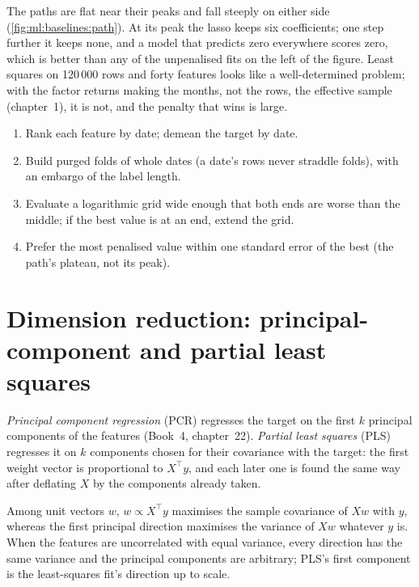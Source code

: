 The paths are flat near their peaks and fall steeply on either side (\cref{fig:ml:baselines:path}). At its peak the
lasso keeps six coefficients; one step further it keeps none, and a model that predicts zero everywhere scores
zero, which is better than any of the unpenalised fits on the left of the figure. Least squares on 120\,000
rows and forty features looks like a well-determined problem; with the factor returns making the months, not the rows,
the effective sample (chapter~1), it is not, and the penalty that wins is large.

\begin{method}\label{met:ml:baselines:penalty}
\begin{enumerate}
\item Rank each feature by date; demean the target by date.
\item Build purged folds of whole dates (a date's rows never straddle folds), with an embargo of the label length.
\item Evaluate a logarithmic grid wide enough that both ends are worse than the middle; if the best value is at an end,
extend the grid.
\item Prefer the most penalised value within one standard error of the best (the path's plateau, not its peak).
\end{enumerate}
\end{method}

\section{Dimension reduction: principal-component and partial least squares}

\begin{definition}\label{def:ml:linear-and-regularised-baselines:pcr}
\emph{Principal component regression} (PCR) regresses the target on the first
$k$ principal components of the features (Book~4, chapter~22). \emph{Partial least squares}
(PLS) regresses it on $k$ components chosen for their covariance with the target: the first weight vector is
proportional to $X^\top y$, and each later one is found the same way after deflating $X$ by the components already
taken.
\end{definition}

\begin{proposition}\label{prop:ml:baselines:pls}
Among unit vectors $w$, $w\propto X^\top y$ maximises the sample covariance of $Xw$ with $y$, whereas the first principal
direction maximises the variance of $Xw$ whatever $y$ is. When the features are uncorrelated with equal variance, every
direction has the same variance and the principal components are arbitrary; PLS's first component is the least-squares
fit's direction up to scale.
\end{proposition}

